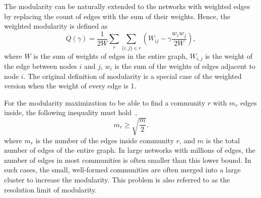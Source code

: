 The modularity can be naturally extended to the networks with weighted edges by replacing the count of edges with the sum of their weights. Hence, the weighted modularity is defined as
\begin{equation} \label{eq:weighted_modularity_definition}
    Q(\gamma) = \frac{1}{2W} \sum_{r} \sum_{\{i,j\}\in r} \left( W_{ij} - \gamma \frac{ w_i w_j }{ 2W } \right),
\end{equation}
where $W$ is the sum of weights of edges in the entire graph, $W_{i,j}$ is the weight of the edge between nodes $i$ and $j$, $w_i$ is the sum of the weights of edges adjacent to node $i$. The original definition of modularity is a special case of the weighted version when the weight of every edge is 1.

For the modularity maximization to be able to find a community $r$ with $m_r$ edges inside, the following inequality must hold~\cite{fortunato2007resolution},
\begin{equation}
m_r \geq \sqrt{\frac{m}{2}}.
\end{equation}
where $m_r $ is the number of the edges inside community $r$, and $m$ is the total number of edges of the entire graph. In large networks with millions of edges, the number of edges in most communities is often smaller than this lower bound. In such cases, the small, well-formed communities are often merged into a large cluster to increase the modularity. This problem is also referred to as the resolution limit of modularity.

